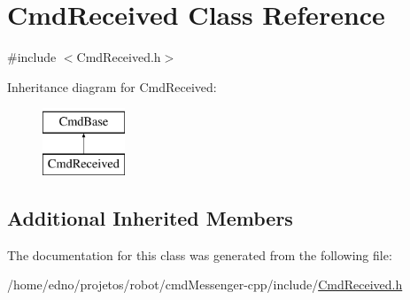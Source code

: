 \hypertarget{class_cmd_received}{\section{Cmd\+Received Class Reference}
\label{class_cmd_received}
}


{\ttfamily \#include $<$Cmd\+Received.\+h$>$}

Inheritance diagram for Cmd\+Received\+:\begin{figure}[H]
\begin{center}
\leavevmode
\includegraphics[height=2.000000cm]{class_cmd_received}
\end{center}
\end{figure}
\subsection*{Additional Inherited Members}


The documentation for this class was generated from the following file\+:\begin{DoxyCompactItemize}
\item 
/home/edno/projetos/robot/cmd\+Messenger-\/cpp/include/\hyperlink{_cmd_received_8h}{Cmd\+Received.\+h}\end{DoxyCompactItemize}
